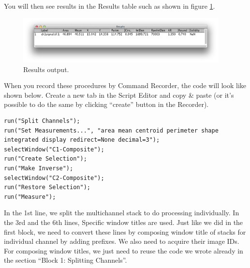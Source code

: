 You will then see results in the Results table such as shown in figure \ref{fig_NucRimMeasureResults}.

\begin{figure}[h!]
\begin{center}
\includegraphics[width=0.95\textwidth]{fig/MeasurementResults.png}
\caption{Results output.}
\label{fig_NucRimMeasureResults}
\end{center}
\end{figure}

When you record these procedures by Command Recorder, the code will look like shown below. Create a new tab in the Script Editor and copy \& paste (or it's possible to do the same by clicking ``create'' button in the Recorder).

\begin{lstlisting}
run("Split Channels");
run("Set Measurements...", "area mean centroid perimeter shape integrated display redirect=None decimal=3");
selectWindow("C1-Composite");
run("Create Selection");
run("Make Inverse");
selectWindow("C2-Composite");
run("Restore Selection");
run("Measure");
\end{lstlisting}

In the 1st line, we split the multichannel stack to do processing individually. In the 3rd and the 6th lines, Specific window titles are used. Just like we did in the first block, we need to convert these lines by composing window title of stacks for individual channel by adding prefixes. We also need to acquire their image IDs. For composing window titles, we just need to reuse the code we wrote already in the section ``Block 1: Splitting Channels''. 






